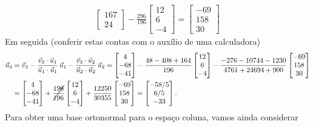 \documentclass[../livro.tex]{subfiles}  %
\begin{document}
\begin{example}
\[\begin{split}
\begin{bmatrix}
 167  \\
 24
\end{bmatrix} - \frac{296}{196}
\begin{bmatrix}
12 \\
6 \\
-4
\end{bmatrix} =
\begin{bmatrix}
 -69  \\
 158  \\
 30
\end{bmatrix}
\end{split}
\] Em seguida (conferir estas contas com o auxílio de uma calculadora)
\[
\begin{split}
\vec{u}_3 & = \vec{v}_3 - \frac{\vec{v}_3 \cdot \vec{u}_1}{\vec{u}_1 \cdot \vec{u}_1} \, \vec{u}_1 - \frac{\vec{v}_3 \cdot \vec{u}_2}{\vec{u}_2 \cdot \vec{u}_2} \, \vec{u}_2 = \begin{bmatrix}
  4 \\
 -68 \\
 -41
\end{bmatrix} - \frac{48-408 + 164}{196}
\begin{bmatrix}
12 \\
6 \\
-4
\end{bmatrix} - \frac{-276 - 10744 - 1230}{4761 + 24694 + 900}
\begin{bmatrix}
 -69  \\
 158  \\
 30
\end{bmatrix} \\
   & = \begin{bmatrix}
  4 \\
 -68 \\
 -41
\end{bmatrix} + \cancel{\frac{196}{196}}
\begin{bmatrix}
12 \\
6 \\
-4
\end{bmatrix} + \frac{12250}{30355}
\begin{bmatrix}
 -69  \\
 158  \\
 30
\end{bmatrix} = \begin{bmatrix}
 -58/5  \\
 6/5  \\
 -33
\end{bmatrix}.
\end{split}
\] Para obter uma base ortonormal para o espaço coluna, vamos ainda considerar

\end{example}
\end{document}
